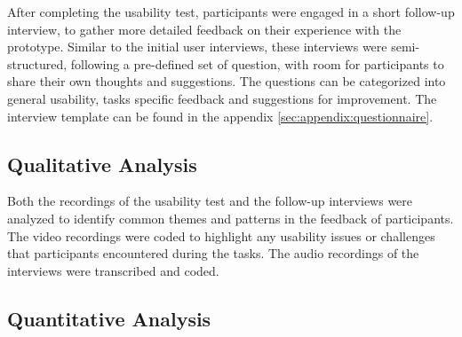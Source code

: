 After completing the usability test, participants were engaged in a short follow-up interview, to gather more detailed feedback on their experience with the prototype. 
Similar to the initial user interviews, these interviews were semi-structured, following a pre-defined set of question, with room for participants to share their own thoughts and suggestions.
The questions can be categorized into general usability, tasks specific feedback and suggestions for improvement.
The interview template can be found in the appendix \ref{sec:appendix:questionnaire}.


\subsection{Qualitative Analysis}
\label{sec:methodology:study:qualitative}

Both the recordings of the usability test and the follow-up interviews were analyzed to identify common themes and patterns in the feedback of participants.
The video recordings were coded to highlight any usability issues or challenges that participants encountered during the tasks.
The audio recordings of the interviews were transcribed and coded.

\subsection{Quantitative Analysis}
\label{sec:methodology:study:quantitative}

